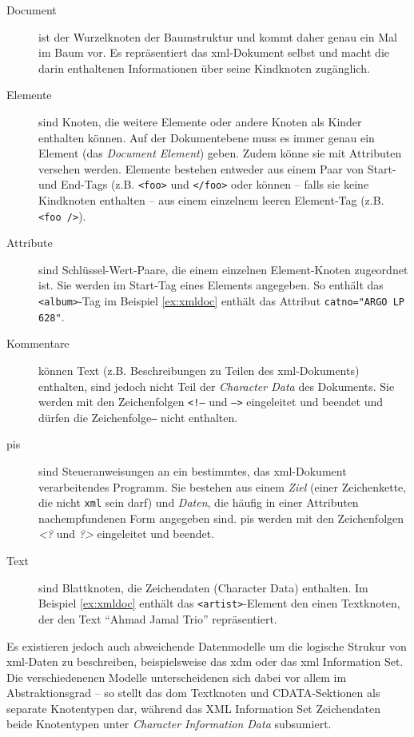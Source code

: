 \begin{description}
    \item[Document] ist der Wurzelknoten der Baumstruktur und kommt daher genau ein Mal im Baum vor. Es repräsentiert das \acrshort{xml}-Dokument selbst und macht die darin enthaltenen Informationen über seine Kindknoten zugänglich.\cite[Abschnitt 2.1]{xmlinfoset}
    \item[Elemente] sind Knoten, die weitere Elemente oder andere Knoten als Kinder enthalten können. Auf der Dokumentebene muss es immer genau ein Element (das \emph{Document Element}) geben. Zudem könne sie mit Attributen versehen werden. Elemente bestehen entweder aus einem Paar von Start- und End-Tags (z.B. \texttt{<foo>} und \texttt{</foo>} oder können -- falls sie keine Kindknoten enthalten -- aus einem einzelnem leeren Element-Tag (z.B. \texttt{<foo />}).
    \item[Attribute] sind Schlüssel-Wert-Paare, die einem einzelnen Element-Knoten zugeordnet ist. Sie werden im Start-Tag eines Elements angegeben. So enthält das \texttt{<album>}-Tag im Beispiel \ref{ex:xmldoc} enthält das Attribut \texttt{catno="ARGO LP 628"}.
    \item[Kommentare] können Text (z.B. Beschreibungen zu Teilen des \acrshort{xml}-Dokuments) enthalten, sind jedoch nicht Teil der \emph{Character Data} des Dokuments. Sie werden mit den Zeichenfolgen \texttt{<!--} und \texttt{-->} eingeleitet und beendet und dürfen die Zeichenfolge\texttt{--} nicht enthalten.\cite[Abschnitt 2.5]{maler2008xml}
    \item[\glspl{pi}] sind Steueranweisungen an ein bestimmtes, das \acrshort{xml}-Dokument verarbeitendes Programm. Sie bestehen aus einem \emph{Ziel} (einer Zeichenkette, die nicht \texttt{xml} sein darf) und \emph{Daten}, die häufig in einer Attributen nachempfundenen Form angegeben sind. \glspl{pi} werden mit den Zeichenfolgen {\emph{<?}} und {\emph{?>}} eingeleitet und beendet.\cite[Abschnitt 2.6]{maler2008xml}
    \item[Text] sind Blattknoten, die Zeichendaten (Character Data) enthalten. Im Beispiel \ref{ex:xmldoc} enthält das \texttt{<artist>}-Element den einen Textknoten, der den Text \enquote{Ahmad Jamal Trio} repräsentiert.
\end{description}

Es existieren jedoch auch abweichende Datenmodelle um die logische Strukur von \acrshort{xml}-Daten zu beschreiben, beispielsweise das \acrfull{xdm} oder das \acrshort{xml} Information Set\cite{xmlinfoset}. Die verschiedenenen Modelle unterscheidenen sich dabei vor allem im Abstraktionsgrad -- so stellt das \gls{dom} Textknoten und CDATA-Sektionen als separate Knotentypen dar, während das XML Information Set Zeichendaten beide Knotentypen unter \emph{Character Information Data} subsumiert\cite[Abschnitt 2.6]{xmlinfoset}.

